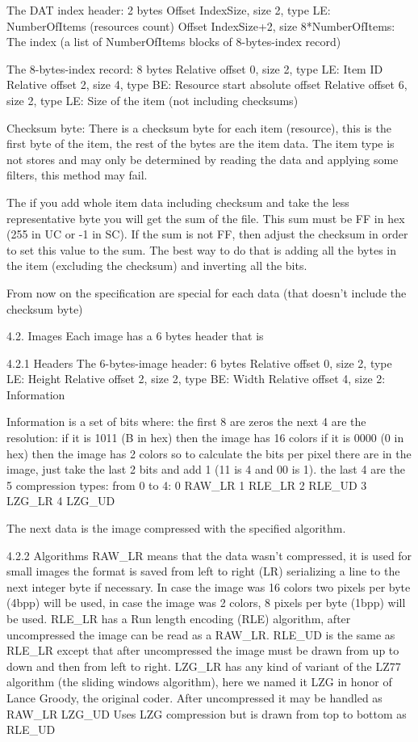  The DAT index header: 2 bytes
  Offset IndexSize, size 2, type LE: NumberOfItems (resources count)
  Offset IndexSize+2, size 8*NumberOfItems: The index (a list of
                              NumberOfItems blocks of 8-bytes-index record)

 The 8-bytes-index record: 8 bytes
  Relative offset 0, size 2, type LE: Item ID
  Relative offset 2, size 4, type BE: Resource start absolute offset
  Relative offset 6, size 2, type LE: Size of the item (not including
                                      checksums)

 Checksum byte:
 There is a checksum byte for each item (resource), this is the first byte
 of the item, the rest of the bytes are the item data. The item type is not
 stores and may only be determined by reading the data and applying some
 filters, this method may fail.

 The if you add whole item data including checksum and take the less
 representative byte you will get the sum of the file. This sum must be FF
 in hex (255 in UC or -1 in SC). If the sum is not FF, then adjust the
 checksum in order to set this value to the sum. The best way to do that is
 adding all the bytes in the item (excluding the checksum) and inverting
 all the bits.

 From now on the specification are special for each data (that doesn't
 include the checksum byte)

4.2. Images
 Each image has a 6 bytes header that is

4.2.1 Headers
 The 6-bytes-image header: 6 bytes
  Relative offset 0, size 2, type LE: Height
  Relative offset 2, size 2, type BE: Width 
  Relative offset 4, size 2: Information

 Information is a set of bits where:
  the first 8 are zeros
  the next 4 are the resolution:
   if it is 1011 (B in hex) then the image has 16 colors
   if it is 0000 (0 in hex) then the image has 2 colors
   so to calculate the bits per pixel there are in the image, just take the
   last 2 bits and add 1 (11 is 4 and 00 is 1).
  the last 4 are the 5 compression types:
   from 0 to 4:
   0 RAW_LR
   1 RLE_LR
   2 RLE_UD
   3 LZG_LR
   4 LZG_UD

 The next data is the image compressed with the specified algorithm.

4.2.2 Algorithms
 RAW_LR means that the data wasn't compressed, it is used for small images
        the format is saved from left to right (LR) serializing a line to
        the next integer byte if necessary. In case the image was 16 colors
	two pixels per byte (4bpp) will be used, in case the image was 2
	colors, 8 pixels per byte (1bpp) will be used.
 RLE_LR has a Run length encoding (RLE) algorithm, after uncompressed the
        image can be read as a RAW_LR.
 RLE_UD is the same as RLE_LR except that after uncompressed the image must
        be drawn from up to down and then from left to right.
 LZG_LR has any kind of variant of the LZ77 algorithm (the sliding windows
        algorithm), here we named it LZG in honor of Lance Groody, the
        original coder.
        After uncompressed it may be handled as RAW_LR
 LZG_UD Uses LZG compression but is drawn from top to bottom as RLE_UD

